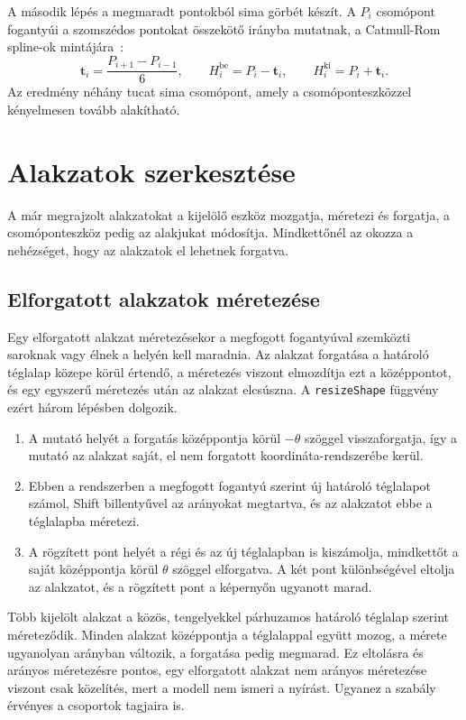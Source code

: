 A második lépés a megmaradt pontokból sima görbét készít. A $P_i$ csomópont fogantyúi a szomszédos pontokat összekötő irányba mutatnak, a Catmull-Rom spline-ok mintájára~\cite{catmull1974}:
\[
\mathbf{t}_i = \frac{P_{i+1} - P_{i-1}}{6}, \qquad
H^{\mathrm{be}}_i = P_i - \mathbf{t}_i, \qquad H^{\mathrm{ki}}_i = P_i + \mathbf{t}_i .
\]
Az eredmény néhány tucat sima csomópont, amely a csomóponteszközzel kényelmesen tovább alakítható.

\section{Alakzatok szerkesztése}
\label{sec:editing}

A már megrajzolt alakzatokat a kijelölő eszköz mozgatja, méretezi és forgatja, a csomóponteszköz pedig az alakjukat módosítja. Mindkettőnél az okozza a nehézséget, hogy az alakzatok el lehetnek forgatva.

\subsection{Elforgatott alakzatok méretezése}

Egy elforgatott alakzat méretezésekor a megfogott fogantyúval szemközti saroknak vagy élnek a helyén kell maradnia. Az alakzat forgatása a határoló téglalap közepe körül értendő, a méretezés viszont elmozdítja ezt a középpontot, és egy egyszerű méretezés után az alakzat elcsúszna. A \texttt{resizeShape} függvény ezért három lépésben dolgozik.

\begin{enumerate}
\item A mutató helyét a forgatás középpontja körül $-\theta$ szöggel visszaforgatja, így a mutató az alakzat saját, el nem forgatott koordináta-rendszerébe kerül.
\item Ebben a rendszerben a megfogott fogantyú szerint új határoló téglalapot számol, Shift billentyűvel az arányokat megtartva, és az alakzatot ebbe a téglalapba méretezi.
\item A rögzített pont helyét a régi és az új téglalapban is kiszámolja, mindkettőt a saját középpontja körül $\theta$ szöggel elforgatva. A két pont különbségével eltolja az alakzatot, és a rögzített pont a képernyőn ugyanott marad.
\end{enumerate}

Több kijelölt alakzat a közös, tengelyekkel párhuzamos határoló téglalap szerint méreteződik. Minden alakzat középpontja a téglalappal együtt mozog, a mérete ugyanolyan arányban változik, a forgatása pedig megmarad. Ez eltolásra és arányos méretezésre pontos, egy elforgatott alakzat nem arányos méretezése viszont csak közelítés, mert a modell nem ismeri a nyírást. Ugyanez a szabály érvényes a csoportok tagjaira is.

